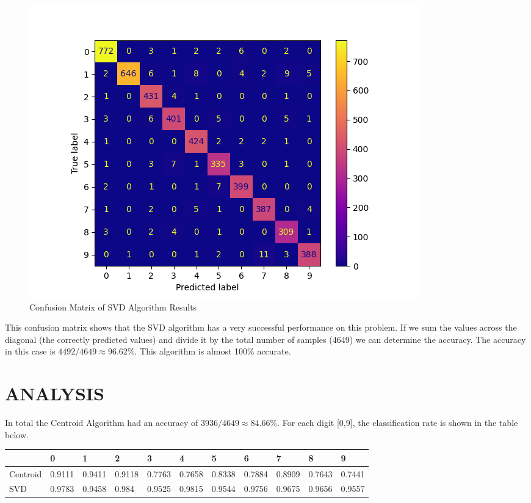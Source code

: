 \documentclass[dvipsnames,12pt]{article} %
\begin{document}
          \begin{figure}[h!]
	\centering
	\includegraphics[width = \textwidth]{FPPtest_svd17_confusion.png}
	\caption{Confusion Matrix of SVD Algorithm Results}
	\label{fig: FIG 04}
\end{figure}

\vspace{06pt}

This confusion matrix shows that the SVD algorithm has a very successful performance on this problem. If we sum the values across the diagonal (the correctly predicted values) and divide it by the total number of samples (4649) we can determine the accuracy. The accuracy in this case is $4492/4649 \approx 96.62\%$. This algorithm is almost 100\% accurate.

      \section{ANALYSIS}
        \label{SECT 05:ANALYSIS}


        \vspace{06pt}
        
        In total the Centroid Algorithm had an accuracy of $3936/4649 \approx 84.66\%$. For each digit [0,9], the classification rate is shown in the table below.  

\newpage
              
 \begin{table}[]
\begin{tabular}{|l|l|l|l|l|l|l|l|l|l|l|}
\hline
         & 0      & 1      & 2      & 3      & 4      & 5      & 6      & 7      & 8      & 9      \\ \hline
Centroid & 0.9111 & 0.9411 & 0.9118 & 0.7763 & 0.7658 & 0.8338 & 0.7884 & 0.8909 & 0.7643 & 0.7441 \\ \hline
SVD      & 0.9783 & 0.9458 & 0.984  & 0.9525 & 0.9815 & 0.9544 & 0.9756 & 0.9675 & 0.9656 & 0.9557 \\ \hline
\end{tabular}
\end{table}
\end{document}
